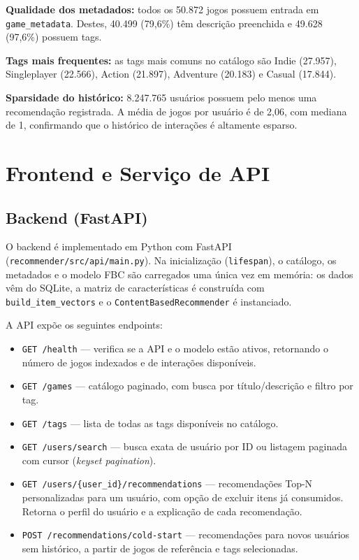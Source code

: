 \documentclass[12pt,a4paper]{article}
\begin{document}
\textbf{Qualidade dos metadados:} todos os 50.872 jogos possuem entrada em \texttt{game\_metadata}. Destes, 40.499 (79,6\%) têm descrição preenchida e 49.628 (97,6\%) possuem tags.

\textbf{Tags mais frequentes:} as tags mais comuns no catálogo são Indie (27.957), Singleplayer (22.566), Action (21.897), Adventure (20.183) e Casual (17.844).

\textbf{Sparsidade do histórico:} 8.247.765 usuários possuem pelo menos uma recomendação registrada. A média de jogos por usuário é de 2,06, com mediana de 1, confirmando que o histórico de interações é altamente esparso.

\section{Frontend e Serviço de API}

\subsection{Backend (FastAPI)}

O backend é implementado em Python com FastAPI (\texttt{recommender/src/api/main.py}). Na inicialização (\texttt{lifespan}), o catálogo, os metadados e o modelo FBC são carregados uma única vez em memória: os dados vêm do SQLite, a matriz de características é construída com \texttt{build\_item\_vectors} e o \texttt{ContentBasedRecommender} é instanciado.

A API expõe os seguintes endpoints:

\begin{itemize}
    \item \texttt{GET /health} — verifica se a API e o modelo estão ativos, retornando o número de jogos indexados e de interações disponíveis.
    \item \texttt{GET /games} — catálogo paginado, com busca por título/descrição e filtro por tag.
    \item \texttt{GET /tags} — lista de todas as tags disponíveis no catálogo.
    \item \texttt{GET /users/search} — busca exata de usuário por ID ou listagem paginada com cursor (\emph{keyset pagination}).
    \item \texttt{GET /users/\{user\_id\}/recommendations} — recomendações Top-N personalizadas para um usuário, com opção de excluir itens já consumidos. Retorna o perfil do usuário e a explicação de cada recomendação.
    \item \texttt{POST /recommendations/cold-start} — recomendações para novos usuários sem histórico, a partir de jogos de referência e tags selecionadas.
\end{itemize}
\end{document}
